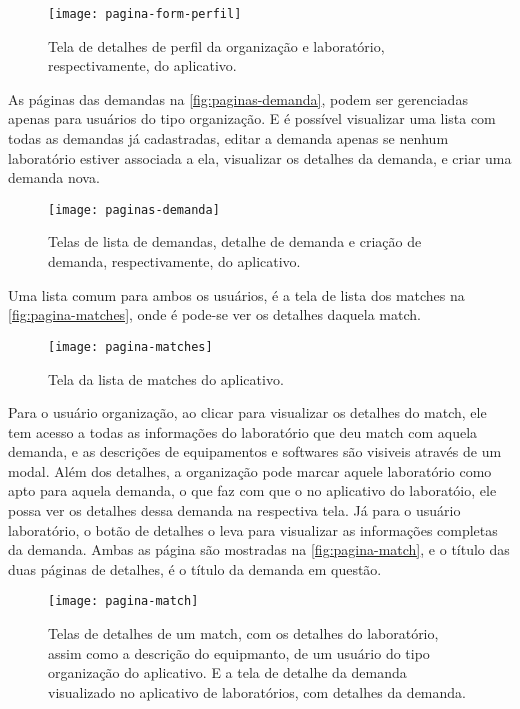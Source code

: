 \begin{figure}[h!]
    \captionsetup{width=0.43\textwidth}
    \caption{Tela de detalhes de perfil da organização e laboratório, respectivamente, do aplicativo.}
    \label{fig:pagina-form-perfil}
    \texttt{[image: pagina-form-perfil]}
    \fonte{}
\end{figure}

As páginas das demandas na \autoref{fig:paginas-demanda}, podem ser gerenciadas apenas para usuários do tipo organização. E é possível visualizar uma lista com todas as demandas já cadastradas, editar a demanda apenas se nenhum laboratório estiver associada a ela, visualizar os detalhes da demanda, e criar uma demanda nova.

\begin{figure}[h!]
    \captionsetup{width=0.43\textwidth}
    \caption{Telas de lista de demandas, detalhe de demanda e criação de demanda, respectivamente, do aplicativo.}
    \label{fig:paginas-demanda}
    \texttt{[image: paginas-demanda]}
    \fonte{}
\end{figure}

Uma lista comum para ambos os usuários, é a tela de lista dos matches na \autoref{fig:pagina-matches}, onde é pode-se ver os detalhes daquela match.

\begin{figure}[h!]
    \captionsetup{width=0.43\textwidth}
    \caption{Tela da lista de matches do aplicativo.}
    \label{fig:pagina-matches}
    \texttt{[image: pagina-matches]}
    \fonte{}
\end{figure}

Para o usuário organização, ao clicar para visualizar os detalhes do match, ele tem acesso a todas as informações do laboratório que deu match com aquela demanda, e as descrições de equipamentos e softwares são visiveis através de um modal. Além dos detalhes, a organização pode marcar aquele laboratório como apto para aquela demanda, o que faz com que o no aplicativo do laboratóio, ele possa ver os detalhes dessa demanda na respectiva tela. Já para o usuário laboratório, o botão de detalhes o leva para visualizar as informações completas da demanda. Ambas as página são mostradas na \autoref{fig:pagina-match}, e o título das duas páginas de detalhes, é o título da demanda em questão.

\begin{figure}[h!]
    \captionsetup{width=0.43\textwidth}
    \caption{Telas de detalhes de um match, com os detalhes do laboratório, assim como a descrição do equipmanto, de um usuário do tipo organização do aplicativo. E a tela de detalhe da demanda visualizado no aplicativo de laboratórios, com detalhes da demanda.}
    \label{fig:pagina-match}
    \texttt{[image: pagina-match]}
    \fonte{}
\end{figure}

